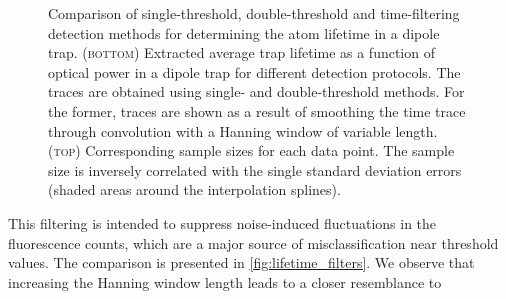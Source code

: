 \documentclass[../Thesis-IJspeert.tex]{subfiles}
\begin{document}
\begin{figure}[!t]
	\caption[Comparison of single-threshold, double-threshold and time-filtering detection methods for determining the atom lifetime in a dipole trap]{Comparison of single-threshold, double-threshold and time-filtering detection methods for determining the atom lifetime in a dipole trap. \textsc{(bottom)} Extracted average trap lifetime as a function of optical power in a dipole trap for different detection protocols. The traces are obtained using single- and double-threshold methods. For the former, traces are shown as a result of smoothing the time trace through convolution with a Hanning window of variable length. \textsc{(top)} Corresponding sample sizes for each data point. The sample size is inversely correlated with the single standard deviation errors (shaded areas around the interpolation splines).}
	\label{fig:lifetime_filters} 
\end{figure}
This filtering is intended to suppress noise-induced fluctuations in the fluorescence counts, which are a major source of misclassification near threshold values. The comparison is presented in \autoref{fig:lifetime_filters}. We observe that increasing the Hanning window length leads to a closer resemblance to
\end{document}
